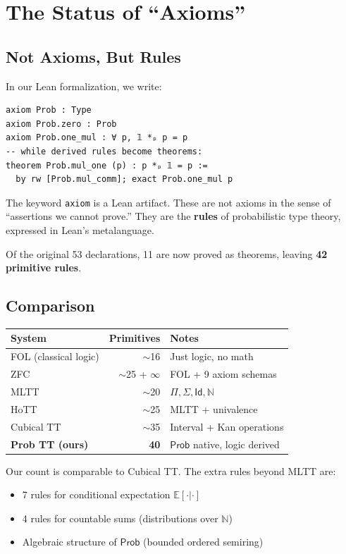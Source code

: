 \documentclass[11pt,a4paper]{article}
\newcommand{\Prob}{\mathsf{Prob}}
\newcommand{\E}{\mathbb{E}}
\newcommand{\Nat}{\mathbb{N}}
\begin{document}
\section{The Status of ``Axioms''}

\subsection{Not Axioms, But Rules}

In our Lean formalization, we write:
\begin{verbatim}
axiom Prob : Type
axiom Prob.zero : Prob
axiom Prob.one_mul : ∀ p, 𝟙 *ₚ p = p
-- while derived rules become theorems:
theorem Prob.mul_one (p) : p *ₚ 𝟙 = p :=
  by rw [Prob.mul_comm]; exact Prob.one_mul p
\end{verbatim}

The keyword \texttt{axiom} is a Lean artifact. These are not axioms in the sense of ``assertions we cannot prove.'' They are the \textbf{rules} of probabilistic type theory, expressed in Lean's metalanguage.

Of the original 53 declarations, 11 are now proved as theorems, leaving \textbf{42 primitive rules}.

\subsection{Comparison}

\begin{center}
\begin{tabular}{lrl}
\toprule
System & Primitives & Notes \\
\midrule
FOL (classical logic) & $\sim$16 & Just logic, no math \\
ZFC & $\sim$25 + $\infty$ & FOL + 9 axiom schemas \\
MLTT & $\sim$20 & $\Pi, \Sigma, \mathsf{Id}, \Nat$ \\
HoTT & $\sim$25 & MLTT + univalence \\
Cubical TT & $\sim$35 & Interval + Kan operations \\
\textbf{Prob TT (ours)} & \textbf{40} & $\Prob$ native, logic derived \\
\bottomrule
\end{tabular}
\end{center}

Our count is comparable to Cubical TT. The extra rules beyond MLTT are:
\begin{itemize}
    \item 7 rules for conditional expectation $\E[\cdot|\cdot]$
    \item 4 rules for countable sums (distributions over $\Nat$)
    \item Algebraic structure of $\Prob$ (bounded ordered semiring)
\end{itemize}
\end{document}
